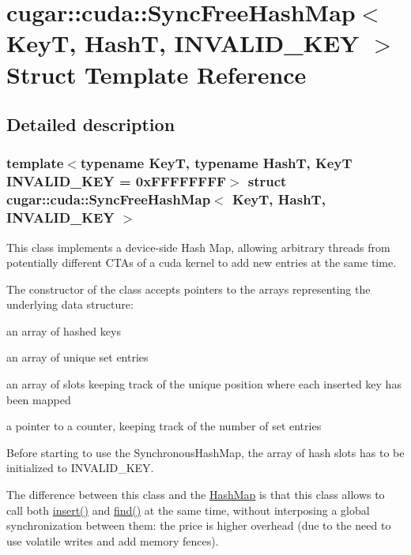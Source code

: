 \hypertarget{structcugar_1_1cuda_1_1_sync_free_hash_map}{}\section{cugar\+:\+:cuda\+:\+:Sync\+Free\+Hash\+Map$<$ KeyT, HashT, I\+N\+V\+A\+L\+I\+D\+\_\+\+K\+EY $>$ Struct Template Reference}
\label{structcugar_1_1cuda_1_1_sync_free_hash_map}


\subsection{Detailed description}
\subsubsection*{template$<$typename KeyT, typename HashT, KeyT I\+N\+V\+A\+L\+I\+D\+\_\+\+K\+EY = 0x\+F\+F\+F\+F\+F\+F\+FF$>$\newline
struct cugar\+::cuda\+::\+Sync\+Free\+Hash\+Map$<$ Key\+T, Hash\+T, I\+N\+V\+A\+L\+I\+D\+\_\+\+K\+E\+Y $>$}

This class implements a device-\/side Hash Map, allowing arbitrary threads from potentially different C\+T\+As of a cuda kernel to add new entries at the same time.

The constructor of the class accepts pointers to the arrays representing the underlying data structure\+:


\begin{DoxyItemize}
\item an array of hashed keys
\item an array of unique set entries
\item an array of slots keeping track of the unique position where each inserted key has been mapped
\item a pointer to a counter, keeping track of the number of set entries
\end{DoxyItemize}

Before starting to use the Synchronous\+Hash\+Map, the array of hash slots has to be initialized to I\+N\+V\+A\+L\+I\+D\+\_\+\+K\+EY.

The difference between this class and the \hyperlink{structcugar_1_1cuda_1_1_hash_map}{Hash\+Map} is that this class allows to call both \hyperlink{structcugar_1_1cuda_1_1_sync_free_hash_map_aa3c8cdbaaeceb10563b073635b230d9c}{insert()} and \hyperlink{structcugar_1_1cuda_1_1_sync_free_hash_map_ab18b0af6061e752201eb9ca8623c963d}{find()} at the same time, without interposing a global synchronization between them\+: the price is higher overhead (due to the need to use volatile writes and add memory fences). 

